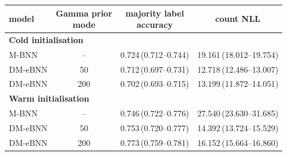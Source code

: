 \begin{tabular}{lccc}
\toprule
model & \shortstack{Gamma prior\\mode} & \shortstack{majority label\\accuracy} & count NLL \\
\midrule
\multicolumn{4}{l}{\textbf{Cold initialisation}} \\
M-BNN & -- & 0.724\,(0.712--0.744) & 19.161\,(18.012--19.754) \\
DM-eBNN & 50 & 0.712\,(0.697--0.731) & 12.718\,(12.486--13.007) \\
DM-eBNN & 200 & 0.702\,(0.693--0.715) & 13.199\,(11.872--14.051) \\
\midrule
\multicolumn{4}{l}{\textbf{Warm initialisation}} \\
M-BNN & -- & 0.746\,(0.722--0.776) & 27.540\,(23.630--31.685) \\
DM-eBNN & 50 & 0.753\,(0.720--0.777) & 14.392\,(13.724--15.529) \\
DM-eBNN & 200 & 0.773\,(0.759--0.781) & 16.152\,(15.664--16.860) \\
\bottomrule
\end{tabular}
